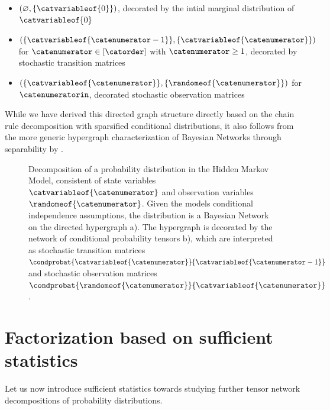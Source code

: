 \begin{example}
    \begin{itemize}
        \item $(\varnothing,\{\catvariableof{0}\})$, decorated by the intial marginal distribution of $\catvariableof{0}$
        \item $(\{\catvariableof{\catenumerator-1}\}, \{\catvariableof{\catenumerator}\})$ for $\catenumerator\in[\catorder]$ with $\catenumerator\geq1$, decorated by stochastic transition matrices
        \item $(\{\catvariableof{\catenumerator}\}, \{\randomeof{\catenumerator}\})$ for $\catenumeratorin$, decorated stochastic observation matrices
    \end{itemize}
    While we have derived this directed graph structure directly based on the chain rule decomposition with sparsified conditional distributions, it also follows from the more generic hypergraph characterization of Bayesian Networks through separability by .
\end{example}

\begin{figure}[t]
    \begin{center}
        
    \end{center}
    \caption{Decomposition of a probability distribution in the Hidden Markov Model, consistent of state variables $\catvariableof{\catenumerator}$ and observation variables $\randomeof{\catenumerator}$.
    Given the models conditional independence assumptions, the distribution is a Bayesian Network on the directed hypergraph a).
    The hypergraph is decorated by the network of conditional probability tensors b), which are interpreted as stochastic transition matrices $\condprobat{\catvariableof{\catenumerator}}{\catvariableof{\catenumerator-1}}$ and stochastic observation matrices $\condprobat{\randomeof{\catenumerator}}{\catvariableof{\catenumerator}}$.
    }
    \label{fig:HMM}
\end{figure}


\section{Factorization based on sufficient statistics}


Let us now introduce sufficient statistics towards studying further tensor network decompositions of probability distributions.

